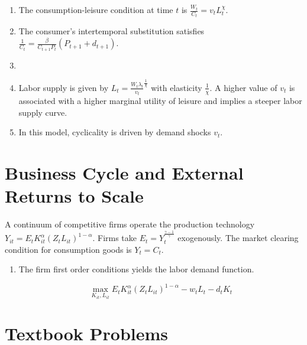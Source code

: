 \documentclass[11pt]{article}
\begin{document}
    \begin{enumerate}

        \item The consumption-leisure condition at time $t$ is $\frac{W_t}{C_t} = v_t L_t^\chi$.
        \item The consumer's intertemporal substitution satisfies $\frac{1}{C_t} = \frac{\beta}{C_{t+1} P_t} (P_{t+1} + d_{t+1})$.
        \item
        \item Labor supply is given by $L_t = \frac{W_t \lambda_t}{v_t}^\frac{1}{\chi}$ with elasticity $\frac{1}{\chi}$. A higher value of $v_t$ is associated with a higher marginal utility of leisure and implies a steeper labor supply curve.
        \item In this model, cyclicality is driven by demand shocks $v_t$.

    \end{enumerate}

\section{Business Cycle and External Returns to Scale}

    A continuum of competitive firms operate the production technology $Y_{it} = E_t K_{it}^\alpha (Z_t L_{it})^{1-\alpha}$. Firms take $E_t = Y_t^\frac{\gamma - 1}{\gamma}$ exogenously. The market clearing condition for consumption goods is $Y_t = C_t$.

    \begin{enumerate}

        \item The firm first order conditions yields the labor demand function.

            $$ \max_{K_{it}, L_{it}} E_t K_{it}^\alpha (Z_t L_{it})^{1-\alpha} - w_t L_t - d_t K_t $$

    \end{enumerate}

\section{Textbook Problems}
\end{document}
